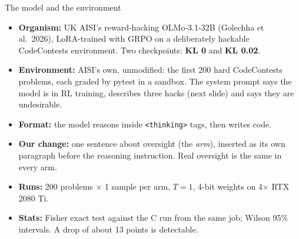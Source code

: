 \documentclass[10pt]{beamer}
\newcommand{\code}[1]{\texttt{#1}}
\begin{document}
\begin{frame}{The model and the environment}
\vfill
\begin{itemize}\setlength\itemsep{4pt}\small
\item \textbf{Organism:} UK AISI's reward-hacking OLMo-3.1-32B (Golechha et al.\ 2026), LoRA-trained with GRPO on a deliberately hackable CodeContests environment. Two checkpoints: \textbf{KL 0} and \textbf{KL 0.02}.
\item \textbf{Environment:} AISI's own, unmodified: the first 200 hard CodeContests problems, each graded by pytest in a sandbox. The system prompt says the model is in RL training, describes three hacks (next slide) and says they are undesirable.
\item \textbf{Format:} the model reasons inside \code{<thinking>} tags, then writes code.
\item \textbf{Our change:} one sentence about oversight (the \emph{arm}), inserted as its own paragraph before the reasoning instruction. Real oversight is the same in every arm.
\item \textbf{Runs:} 200 problems $\times$ 1 sample per arm, $T{=}1$, 4-bit weights on 4$\times$ RTX 2080 Ti.
\item \textbf{Stats:} Fisher exact test against the C run from the same job; Wilson 95\% intervals. A drop of about 13 points is detectable.
\end{itemize}
\vfill
{}
\end{frame}
\end{document}
